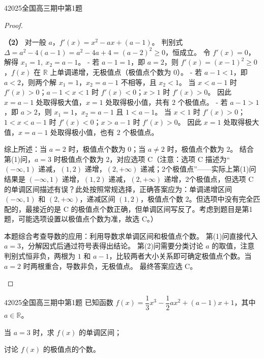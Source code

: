 \documentclass[
showanswers,        %
answercolor=red,    %
paper=a4,           %
sectioncolor=cyan,  %
subsectioncolor=cyan,
exercisecolor=orange, %
examplecolor=cyan,    %
bianshicolor=purple   %
]{biscuits}
\begin{document}
\begin{example}{4}{2025}{全国}{高三}{期中}{第1题}
\begin{proof}
\begin{answer}
				\noindent\textbf{（2）} 对一般 $a$，$f'(x)=x^2-ax+(a-1)$。  
				判别式 $\Delta = a^2-4(a-1)=a^2-4a+4=(a-2)^2 \ge 0$，恒成立。  
				令 $f'(x)=0$，解得 $x_1=1,\ x_2=a-1$。  
				- 若 $a-1 = 1$，即 $a=2$，则 $f'(x)=(x-1)^2\ge 0$，$f(x)$ 在 $\mathbb{R}$ 上单调递增，无极值点（极值点个数为 $0$）。  
				- 若 $a-1 < 1$，即 $a<2$，则两个解 $x_1=1$，$x_2=a-1$ 不相等，且 $x_2<1$。  
				当 $x<a-1$ 时 $f'(x)>0$；$a-1<x<1$ 时 $f'(x)<0$；$x>1$ 时 $f'(x)>0$。  
				因此 $x=a-1$ 处取得极大值，$x=1$ 处取得极小值，共有 $2$ 个极值点。  
				- 若 $a-1 > 1$，即 $a>2$，则 $x_1=1$，$x_2=a-1$ 且 $1<a-1$。  
				当 $x<1$ 时 $f'(x)>0$；$1<x<a-1$ 时 $f'(x)<0$；$x>a-1$ 时 $f'(x)>0$。  
				因此 $x=1$ 处取得极大值，$x=a-1$ 处取得极小值，也有 $2$ 个极值点。  
				
				综上所述：当 $a=2$ 时，极值点个数为 $0$；当 $a\neq2$ 时，极值点个数为 $2$。  
				结合第(1)问，$a=3$ 时极值点个数为 $2$，对应选项 C（注意：选项 C 描述为“$(-\infty,1)$ 递减，$(1,2)$ 递增，$(2,+\infty)$ 递减；2个极值点”——实际上第(1)问结果是 $(-\infty,1)$ 递增，$(1,2)$ 递减，$(2,+\infty)$ 递增，2个极值点，但选项 C 的单调区间描述有误？此处按照常规选择，正确答案应为：单调递增区间 $(-\infty,1)$ 和 $(2,+\infty)$，递减区间 $(1,2)$，极值点个数 $2$。但选项中没有完全匹配的，最接近的是 C 的极值点个数正确，但单调区间写反了。考虑到题目是第1题，可能选项设置以极值点个数为准，故选 C。）
			\end{answer}
			\begin{solutions}
				本题综合考查导数的应用：利用导数求单调区间和极值点个数。  
				第(1)问直接代入 $a=3$，分解因式后通过符号表得出结论。  
				第(2)问需要分类讨论 $a$ 的取值，注意判别式恒非负，两根为 $1$ 和 $a-1$，比较两者大小关系即可确定极值点个数。当 $a=2$ 时两根重合，导数非负，无极值点。  
				最终答案应选 C。
			\end{solutions}
		\end{proof}
	\end{example}\begin{example}{4}{2025}{全国}{高三}{期中}{第1题}
		已知函数 $f(x)=\dfrac{1}{3}x^3-\dfrac{1}{2}ax^2+(a-1)x+1$，其中 $a\in\mathbb{R}$。
		\begin{quan}
			\item 当 $a=3$ 时，求 $f(x)$ 的单调区间；
			\item 讨论 $f(x)$ 的极值点的个数。
		\end{quan}
		\begin{choices}

\end{choices}
\end{example}
\end{document}
